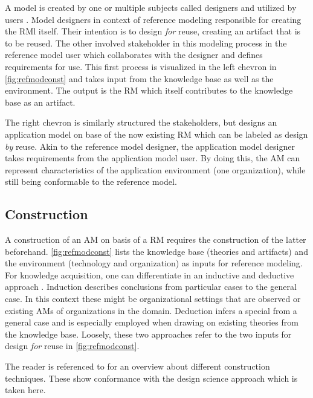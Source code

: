 				  \citep[]{vom2006reusable}
				  
		A model is created by one or multiple subjects called designers and utilized by users \cite{becker2004handelsinformationssysteme}. Model designers in context of reference modeling responsible for creating the \acrshort{RM}l itself. Their intention is to design \textit{for} reuse, \ie creating an artifact that is to be reused. The other involved stakeholder in this modeling process in the reference model user which collaborates with the designer and defines requirements for use. This first process is visualized in the left chevron in \Fig \ref{fig:refmodconst} and takes input from the knowledge base as well as the environment. The output is the  \acrshort{RM} which itself contributes to the knowledge base as an artifact. 
		
		The right chevron is similarly structured \wrt the stakeholders, but designs an application model on base of the now existing \acrshort{RM} which can be labeled as design \textit{by} reuse. Akin to the reference model designer, the application model designer takes requirements from the application model user. By doing this, the  \acrshort{AM} can represent characteristics of the application environment (\ie one organization), while still being conformable to the reference model. 
		
		\subsection{Construction}
		A construction of an \acrshort{AM} on basis of a \acrshort{RM} requires the construction of the latter beforehand. 
		\Fig \ref{fig:refmodconst} lists the knowledge base (theories and artifacts) and the environment (technology and organization) as inputs for reference modeling. For knowledge acquisition, one can differentiate in an inductive and deductive approach \cite{thomas2006mang}. Induction describes conclusions from particular cases to the general case. In this context these might be organizational settings that are observed or existing \acrshort{AM}s of organizations in the domain. Deduction infers a special from a general case and is especially employed when drawing on existing theories from the knowledge base. Loosely, these two approaches refer to the two inputs for design \textit{for} reuse in \Fig \ref{fig:refmodconst}. 
		
		The reader is referenced to \cite{Fettke2014meth} for an overview about different construction techniques. These show conformance with the design science approach \citep[]{Puster2015} which is taken here. 
		
